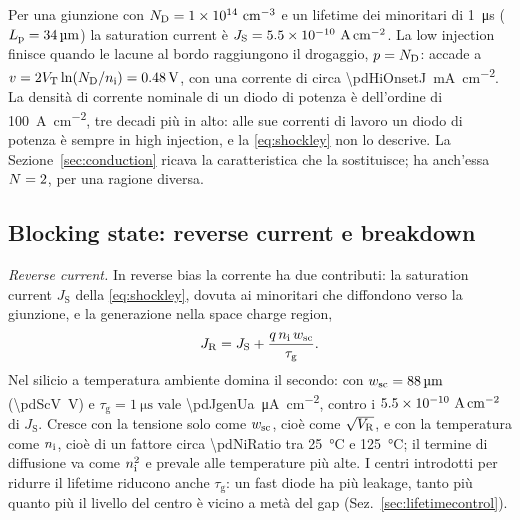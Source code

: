 \documentclass[10pt,a4paper]{scrartcl}
\let\newcommand\pdvaluedefine
\newcommand{\VR}{V_\mathrm{R}}
\newcommand{\VT}{V_\mathrm{T}}
\newcommand{\Nem}{N}                          %
\newcommand{\ND}{N_\mathrm{D}}
\newcommand{\nint}{n_\mathrm{i}}
\newcommand{\wsc}{w_\mathrm{sc}}
\newcommand{\Pp}{p\textsuperscript{+}}
\newcommand{\Nm}{n\textsuperscript{--}}
\newcommand{\cmc}{\si{\centi\metre^{-3}}}
\newcommand{\Acm}{\si{\ampere\per\centi\metre\squared}}
\begin{document}
Per una giunzione \Pp\Nm{} con $\ND = \pdExNd\ \cmc$ e un lifetime dei minoritari di \SI{1}{\micro\second} ($L_\mathrm{p} = \SI{34}{\micro\metre}$) la saturation current è $J_\mathrm{S} = \pdJsShockley\ \Acm$. La low injection finisce quando le lacune al bordo raggiungono il drogaggio, $p = \ND$: accade a $v = 2\VT\ln(\ND/\nint) = \SI{\pdHiOnsetV}{\volt}$, con una corrente di circa \SI{\pdHiOnsetJ}{\milli\ampere\per\centi\metre\squared}. La densità di corrente nominale di un diodo di potenza è dell'ordine di \SI{100}{\ampere\per\centi\metre\squared}, tre decadi più in alto: alle sue correnti di lavoro un diodo di potenza è sempre in high injection, e la \eqref{eq:shockley} non lo descrive. La Sezione~\ref{sec:conduction} ricava la caratteristica che la sostituisce; ha anch'essa $\Nem = 2$, per una ragione diversa.

\subsection{Blocking state: reverse current e breakdown}
\label{sec:blockingphys}
\emph{Reverse current.} In reverse bias la corrente ha due contributi: la saturation current $J_\mathrm{S}$ della \eqref{eq:shockley}, dovuta ai minoritari che diffondono verso la giunzione, e la generazione nella space charge region,
\begin{equation}
J_\mathrm{R} = J_\mathrm{S} + \frac{q\,\nint\,\wsc}{\tau_\mathrm{g}} .
\label{eq:jgen}
\end{equation}
Nel silicio a temperatura ambiente domina il secondo: con $\wsc = \SI{\pdScW}{\micro\metre}$ (\SI{\pdScV}{\volt}) e $\tau_\mathrm{g} = \SI{1}{\micro\second}$ vale \SI{\pdJgenUa}{\micro\ampere\per\centi\metre\squared}, contro i $\pdJsShockley\ \Acm$ di $J_\mathrm{S}$. Cresce con la tensione solo come $\wsc$, cioè come $\sqrt{\VR}$, e con la temperatura come $\nint$, cioè di un fattore circa \num{\pdNiRatio} tra \SI{25}{\celsius} e \SI{125}{\celsius}; il termine di diffusione va come $\nint^2$ e prevale alle temperature più alte. I centri introdotti per ridurre il lifetime riducono anche $\tau_\mathrm{g}$: un fast diode ha più leakage, tanto più quanto più il livello del centro è vicino a metà del gap (Sez.~\ref{sec:lifetimecontrol}).
\end{document}
